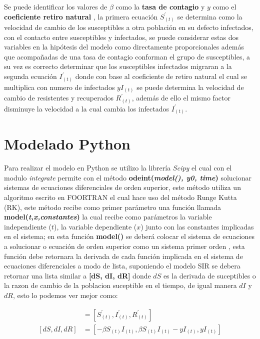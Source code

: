 Se puede identificar los valores de $\beta$ como la \textbf{tasa de contagio} y  $y$ como el \textbf{coeficiente retiro natural} \cite{articulo-sir}, la primera ecuación $S^\prime_{(t)}$ se determina como la velocidad de cambio de los susceptibles a otra población en su defecto infectados,
con el contacto entre susceptibles y infectados, se puede considerar estas dos variables en la hipótesis del modelo como directamente proporcionales además que acompañadas de una tasa de contagio conforman el grupo de susceptibles, a su vez es correcto determinar que los susceptibles infectados migraran a la segunda ecuación $I^\prime_{(t)}$ donde con base al coeficiente de retiro natural el cual se  multiplica con numero de infectados $y I_{(t)}$ se puede determina la velocidad de cambio de resistentes y recuperados $R^\prime_{(t)}$, además de ello el mismo factor disminuye la velocidad a la cual cambia los infectados $I^\prime_{(t)}$\cite{modelo-sir-xd}.

\section{Modelado Python}

Para realizar el modelo en Python se utilizo la librería \textit{Scipy} el cual con el modulo \textit{integrate} permite con el método \textbf{odeint(\textit{model(), y0, time})} solucionar sistemas de ecuaciones diferenciales de orden superior, este método utiliza un algoritmo escrito en FOORTRAN el cual hace uso del método Runge Kutta (RK)\cite{scipy-docs-odeint}, este método recibe como primer parámetro una función llamada \textbf{model(\textit{t,x,constantes})} la cual recibe como parámetros la variable independiente ($t$), la variable dependiente ($x$) junto con las constantes implicadas en el sistema; en esta función \textbf{model()} se deberá colocar el sistema de ecuaciones a solucionar o ecuación de orden superior como un sistema primer orden \cite{indu-sistema-primer-orden}, esta función debe retornara la derivada de cada función implicada en el sistema de ecuaciones diferenciales a modo de lista, suponiendo el modelo SIR se debera retornar una lista similar a \textbf{[dS, dI, dR]} donde $dS$ es la derivada de suceptibles o la razon de cambio de la poblacion suceptible en el tiempo, de igual manera $dI$ y $dR$, esto lo podemos ver mejor como: 

\begin{align*}
 [dS, dI, dR] &= [S^\prime_{(t)}, I^\prime_{(t)}, R^\prime_{(t)}] \\
 [dS, dI, dR] &= [-\beta S_{(t)} I_{(t)} , \beta S_{(t)} I_{(t)} - yI_{(t)} , yI_{(t)}]
\end{align*}

